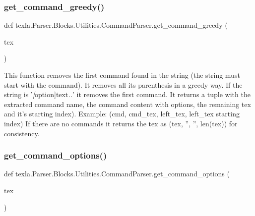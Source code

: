 \subsubsection{\texorpdfstring{get\+\_\+command\+\_\+greedy()}{get\_command\_greedy()}}
{\footnotesize\ttfamily def texla.\+Parser.\+Blocks.\+Utilities.\+Command\+Parser.\+get\+\_\+command\+\_\+greedy (\begin{DoxyParamCaption}\item[{}]{tex }\end{DoxyParamCaption})}

\begin{DoxyVerb}This function removes the first command found in
the string (the string must start with the command).
It removes all its parenthesis in a greedy way.
If the string is '\emph[option]{text}\emph{..}' it removes the
first command.
It returns a tuple with the extracted command name, the command content
with options, the remaining tex and it's starting index).
Example: (cmd,  cmd_tex, left_tex, left_tex starting index)
If there are no commands it returns the tex as
(tex, '', '', len(tex)) for consistency.
\end{DoxyVerb}
 \hypertarget{namespacetexla_1_1Parser_1_1Blocks_1_1Utilities_1_1CommandParser_a9ed772dd4465a09de477be8a41d7e488}{}\label{namespacetexla_1_1Parser_1_1Blocks_1_1Utilities_1_1CommandParser_a9ed772dd4465a09de477be8a41d7e488} 
\subsubsection{\texorpdfstring{get\+\_\+command\+\_\+options()}{get\_command\_options()}}
{\footnotesize\ttfamily def texla.\+Parser.\+Blocks.\+Utilities.\+Command\+Parser.\+get\+\_\+command\+\_\+options (\begin{DoxyParamCaption}\item[{}]{tex }\end{DoxyParamCaption})}

